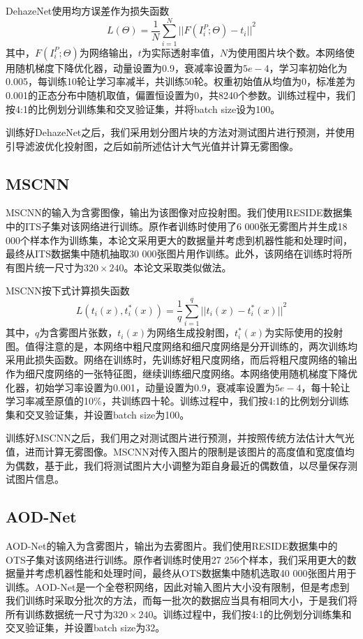 \documentclass[a4paper, 12pt, oneside]{report}
\begin{document}
{DehazeNet使用均方误差作为损失函数
\begin{equation}
L(\Theta) = \frac{1}{N}\sum_{i = 1}^N {||F(I_i^P; \Theta) - t_i||}^2
\end{equation}
其中，$F(I_i^P; \Theta)$为网络输出，$t$为实际透射率值，$N$为使用图片块个数。本网络使用随机梯度下降优化器，动量设置为0.9，衰减率设置为$5e-4$，学习率初始化为0.005，每训练10轮让学习率减半，共训练50轮。权重初始值从均值为0，标准差为0.001的正态分布中随机取值，偏置恒设置为0，共8240个参数。训练过程中，我们按4:1的比例划分训练集和交叉验证集，并将batch size设为100。

训练好DehazeNet之后，我们采用划分图片块的方法对测试图片进行预测，并使用引导滤波优化投射图，之后如前所述估计大气光值并计算无雾图像。

\subsection{MSCNN\quad}
MSCNN的输入为含雾图像，输出为该图像对应投射图。我们使用RESIDE数据集中的ITS子集对该网络进行训练。原作者训练时使用了6 000张无雾图片并生成18 000个样本作为训练集，本论文采用更大的数据量并考虑到机器性能和处理时间，最终从ITS数据集中随机抽取30 000张图片用作训练。此外，该网络在训练时将所有图片统一尺寸为$320 \times 240$。本论文采取类似做法。

MSCNN按下式计算损失函数
\begin{equation}
L(t_i(x), t_i^{\ast}(x)) = \frac{1}{q}\sum_{i = 1}^q {||t_i(x) - t_i^{\ast}(x)||}^2
\end{equation}
其中，$q$为含雾图片张数，$t_i(x)$为网络生成投射图，$t_i^{\ast}(x)$为实际使用的投射图。值得注意的是，本网络中粗尺度网络和细尺度网络是分开训练的，两次训练均采用此损失函数。网络在训练时，先训练好粗尺度网络，而后将粗尺度网络的输出作为细尺度网络的一张特征图，继续训练细尺度网络。本网络使用随机梯度下降优化器，初始学习率设置为0.001，动量设置为0.9，衰减率设置为$5e-4$，每十轮让学习率减至原值的10\%，共训练四十轮。训练过程中，我们按4:1的比例划分训练集和交叉验证集，并设置batch size为100。

训练好MSCNN之后，我们用之对测试图片进行预测，并按照传统方法估计大气光值，进而计算无雾图像。MSCNN对传入图片的限制是该图片的高度值和宽度值均为偶数，基于此，我们将测试图片大小调整为距自身最近的偶数值，以尽量保存测试图片信息。

\subsection{AOD-Net\quad}
AOD-Net的输入为含雾图片，输出为去雾图片。我们使用RESIDE数据集中的OTS子集对该网络进行训练。原作者训练时使用27 256个样本，我们采用更大的数据量并考虑机器性能和处理时间，最终从OTS数据集中随机选取40 000张图片用于训练。AOD-Net是一个全卷积网络，因此对输入图片大小没有限制，但是考虑到我们训练时采取分批次的方法，而每一批次的数据应当具有相同大小，于是我们将所有训练数据统一尺寸为$320 \times 240$。训练过程中，我们按4:1的比例划分训练集和交叉验证集，并设置batch size为32。
	
}
\end{document}
